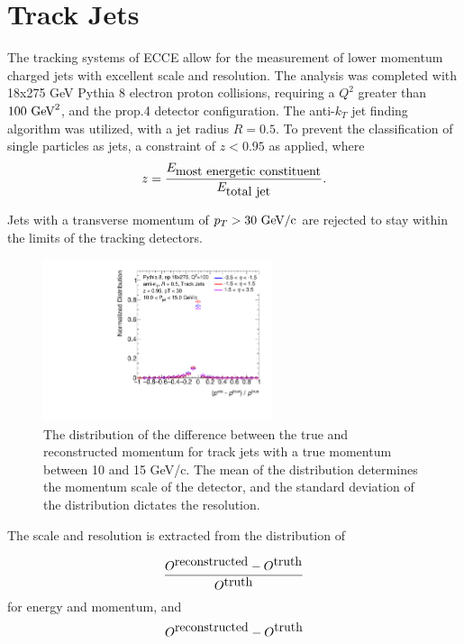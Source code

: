 \section {Track Jets}
\label{section2}

The tracking systems of ECCE allow for the measurement of lower momentum charged jets with excellent scale and resolution.  The analysis was completed with 18x275 GeV Pythia 8 electron proton collisions, requiring a $Q^2$ greater than $100 \hbox{ GeV}^2$, and the prop.4 detector configuration.  The anti-$k_T$ jet finding algorithm was utilized, with a jet radius $R=0.5$.  To prevent the classification of single particles as jets, a constraint of $z<0.95$ as applied, where 
\begin{equation}
z=\frac{E_{\hbox{most energetic constituent}}}{E_{\hbox{total jet}}}.
\label{eq:jet_z}
\end{equation}

Jets with a transverse momentum of $p_T > 30\hbox{ GeV/c}$ are rejected to stay within the limits of the tracking detectors.

\begin{figure}[h]
    \centering
    \includegraphics[width=0.6\textwidth]{figs/Final_Plots/JES_Slice_Plot_EtaBins2_grouped.pdf}
    \caption{The distribution of the difference between the true and reconstructed momentum for track jets with a true momentum between 10 and 15 GeV/c.  The mean of the distribution determines the momentum scale of the detector, and the standard deviation of the distribution dictates the resolution.}
    \label{fig:track_momentum_slice}
\end{figure}

The scale and resolution is extracted from the distribution of 

\begin{equation}
    \frac{O^{\hbox{reconstructed}}-O^{\hbox{truth}}}{O^{\hbox{truth}}}
    \label{eq:distribution}
\end{equation}
for energy and momentum, and 
\begin{equation}
    O^{\hbox{reconstructed}}-O^{\hbox{truth}}
    \label{eq:distribution}
\end{equation}

